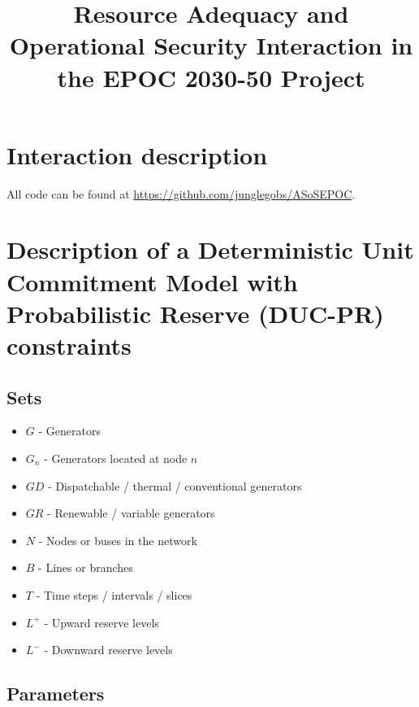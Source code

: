 \documentclass[number,times]{elsarticle}
\begin{document}
\title{Resource Adequacy and Operational Security Interaction in the EPOC 2030-50 Project}

\maketitle

\newpage

\tableofcontents

\newpage

\section{Interaction description}


All code can be found at \href{https://github.com/junglegobs/ASoSEPOC}{https://github.com/junglegobs/ASoSEPOC}.

\section{Description of a Deterministic Unit Commitment Model with Probabilistic Reserve (DUC-PR) constraints}

\subsection{Sets}

\begin{itemize}
    \item $G$ - Generators
    \item $G_n$ - Generators located at node $n$
    \item $GD$ - Dispatchable / thermal / conventional generators
    \item $GR$ - Renewable / variable generators
    \item $N$ - Nodes or buses in the network
    \item $B$ - Lines or branches
    \item $T$ - Time steps / intervals / slices
    \item $L^+$ - Upward reserve levels
    \item $L^-$ - Downward reserve levels
\end{itemize}

\subsection{Parameters}
\end{document}
